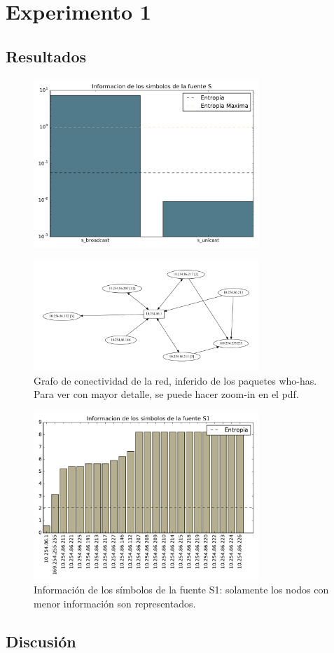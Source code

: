 \section{Experimento 1}

\subsection{Resultados}

\begin{figure}[H]
  \centering
  \includegraphics[width=8.5cm]{exp_starbucks/grafico1.pdf}
  \caption{\normalfont }
\end{figure}

\begin{figure}[H]
  \centering
  \includegraphics[width=8.5cm]{exp_starbucks/grafico2.pdf}
  \caption{  \normalfont Grafo de conectividad de la red, inferido de los paquetes who-has. Para ver con mayor detalle, se puede hacer zoom-in en el pdf. }
\end{figure}

\begin{figure}[H]
  \centering
  \includegraphics[width=8.5cm]{exp_starbucks/grafico3.pdf}
  \caption{ \normalfont Información de los símbolos de la fuente S1: solamente los nodos con menor información son representados.}
\end{figure}

\subsection{Discusión}

